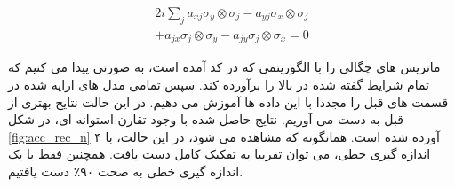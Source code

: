 \begin{equation}
\begin{split}
    2i \sum_j a_{xj}\sigma_y\otimes\sigma_j - a_{yj}\sigma_x\otimes\sigma_j \\
    + a_{jx}\sigma_j\otimes\sigma_y - a_{jy} \sigma_j\otimes\sigma_x = 0
\end{split}
\end{equation}

ماتریس های چگالی را با الگوریتمی که در کد آمده است،‌ به صورتی پیدا می کنیم که تمام شرایط گفته شده در بالا را برآورده کند. سپس تمامی مدل های ارایه شده در قسمت های قبل را مجددا با این داده ها آموزش می دهیم. در این حالت نتایج بهتری از قبل به دست می آوریم. نتایج حاصل شده با وجود تقارن استوانه ای، در شکل
\ref{fig:acc_rec_n}
آورده شده است. همانگونه که مشاهده می شود، در این حالت، با ۴
اندازه گیری خطی، می توان تقریبا به تفکیک کامل دست یافت. همچنین فقط با یک اندازه گیری خطی به صحت
۹۰٪
دست یافتیم.
